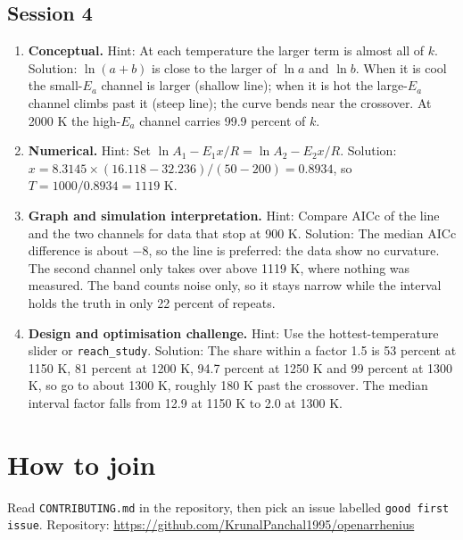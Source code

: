 \documentclass[11pt,a4paper]{article}
\begin{document}
\subsection*{Session 4}
\begin{enumerate}[nosep]
\item \textbf{Conceptual.} Hint: At each temperature the larger term is almost all of $k$. Solution: $\ln(a+b)$ is close to the larger of $\ln a$ and $\ln b$. When it is cool the small-$E_a$ channel is larger (shallow line); when it is hot the large-$E_a$ channel climbs past it (steep line); the curve bends near the crossover. At 2000 K the high-$E_a$ channel carries 99.9 percent of $k$.
\item \textbf{Numerical.} Hint: Set $\ln A_1-E_1x/R=\ln A_2-E_2x/R$. Solution: $x=8.3145\times(16.118-32.236)/(50-200)=0.8934$, so $T=1000/0.8934=1119$ K.
\item \textbf{Graph and simulation interpretation.} Hint: Compare AICc of the line and the two channels for data that stop at 900 K. Solution: The median AICc difference is about $-8$, so the line is preferred: the data show no curvature. The second channel only takes over above 1119 K, where nothing was measured. The band counts noise only, so it stays narrow while the interval holds the truth in only 22 percent of repeats.
\item \textbf{Design and optimisation challenge.} Hint: Use the hottest-temperature slider or \texttt{reach\_study}. Solution: The share within a factor 1.5 is 53 percent at 1150 K, 81 percent at 1200 K, 94.7 percent at 1250 K and 99 percent at 1300 K, so go to about 1300 K, roughly 180 K past the crossover. The median interval factor falls from 12.9 at 1150 K to 2.0 at 1300 K.
\end{enumerate}

\section{How to join}
Read \texttt{CONTRIBUTING.md} in the repository, then pick an issue labelled \texttt{good first issue}. Repository: \url{https://github.com/KrunalPanchal1995/openarrhenius}
\end{document}
